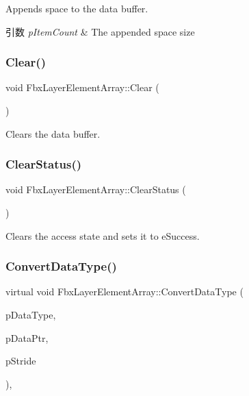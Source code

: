 Appends space to the data buffer. 
\begin{DoxyParams}{引数}
{\em p\+Item\+Count} & The appended space size \\
\hline
\end{DoxyParams}
\mbox{\label{class_fbx_layer_element_array_a573662ad442d13623725fef4e19ca207}} 
\subsubsection{\texorpdfstring{Clear()}{Clear()}}
{\footnotesize\ttfamily void Fbx\+Layer\+Element\+Array\+::\+Clear (\begin{DoxyParamCaption}{ }\end{DoxyParamCaption})}



Clears the data buffer. 

\mbox{\label{class_fbx_layer_element_array_a6873dc740572d69cccb83bdbaf7633b6}} 
\subsubsection{\texorpdfstring{Clear\+Status()}{ClearStatus()}}
{\footnotesize\ttfamily void Fbx\+Layer\+Element\+Array\+::\+Clear\+Status (\begin{DoxyParamCaption}{ }\end{DoxyParamCaption})}



Clears the access state and sets it to e\+Success. 

\mbox{\label{class_fbx_layer_element_array_a48cc30130ebd4a38d910547d2f7282c0}} 
\subsubsection{\texorpdfstring{Convert\+Data\+Type()}{ConvertDataType()}}
{\footnotesize\ttfamily virtual void Fbx\+Layer\+Element\+Array\+::\+Convert\+Data\+Type (\begin{DoxyParamCaption}\item[{\hyperlink{fbxpropertytypes_8h_a73913a5ddfb20e57c6f25e9e6784bd92}{E\+Fbx\+Type}}]{p\+Data\+Type,  }\item[{void $\ast$$\ast$}]{p\+Data\+Ptr,  }\item[{size\+\_\+t $\ast$}]{p\+Stride }\end{DoxyParamCaption})\hspace{0.3cm}{\ttfamily [protected]}, {\ttfamily [virtual]}}

